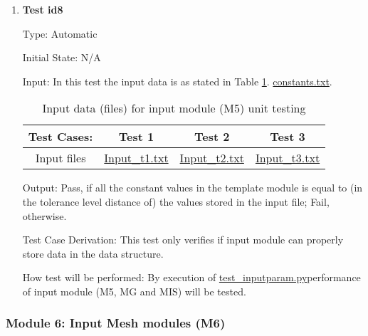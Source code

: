 \documentclass[12pt, titlepage]{article}
\begin{document}
\begin{enumerate}
	
\item{\textbf{Test id8}  \\}
	
Type: Automatic
	
Initial State: N/A
	
Input: In this test the input data is as stated in Table \ref{inputunittest}.  \href{https://github.com/shmouses/SPDFM/tree/master/src/constants.txt}{constants.txt}. 


\begin{table}

\centering
\begin{tabular}{|c|c|c|c|}
\hline
Test Cases: & Test 1 & Test 2 & Test 3 \\
\hline 
Input files & \href{https://github.com/shmouses/SPDFM/tree/master/src/Input/Input_t1.txt}{Input\_t1.txt} & \href{https://github.com/shmouses/SPDFM/tree/master/src/Input/Input_t2.txt}{Input\_t2.txt} & \href{https://github.com/shmouses/SPDFM/tree/master/src/Input/Input_t3.txt}{Input\_t3.txt}  \\
\hline
\end{tabular}
\caption{Input data (files) for input module (M5) unit testing}
\label{inputunittest}
\end{table}


	
Output: Pass, if all the constant values in the template module is equal to (in the tolerance level distance of) the values stored in the input file; Fail, otherwise.
	
Test Case Derivation: This test only verifies if input module can properly store data in the data structure.
	
How test will be performed:  By execution of  \href{https://github.com/shmouses/SPDFM/tree/master/src/test_inputparam.py}{test\_inputparam.py}performance of input module (M5, MG and MIS) will be tested. 

\end{enumerate}


\subsubsection{Module 6: Input Mesh modules (M6)}
\end{document}

